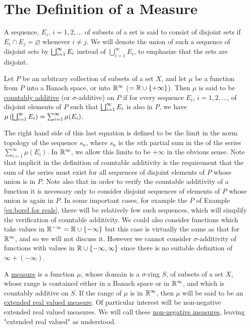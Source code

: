 \section{The Definition of a Measure}


A sequence, $E_i$, $i=1,2,\dots$ of subsets of a set is said to consist of disjoint sets if $E_i\cap E_j=\varnothing$ whenever $i\neq j$. We will denote the union of such a sequence of disjoint sets by $\bigsqcup_{i=1}^\infty E_i$ instead of $\bigcup_{i=1}^\infty E_i$, to emphasize that the sets are disjoint.

\begin{definition}
Let $P$ be an arbitrary collection of subsets of a set $X$, and let $\mu$ be a function from $P$ into a Banach space, or into $\mathbb{R}^\infty$ ($=\mathbb{R}\cup\left\{+\infty\right\}$). Then $\mu$ is said to be \underline{countably additive} (or $\sigma$-additive) on $P$ if for every sequence $E_i$, $i=1,2,\dots$, of disjoint elements of $P$ such that $\bigsqcup_{i=1}^\infty E_i$ is also in $P$, we have $\mu\left(\bigsqcup_{i=1}^\infty E_i\right)=\sum_{i=1}^\infty\mu(E_i)$. 
\end{definition}

The right hand side of this last equation is defined to be the limit in the norm topology of the sequence $s_n$, where $s_n$ is the $n$th partial sum in the of the series $\sum_{i=1}^\infty\mu(E_i)$. In $\mathbb{R}^\infty$, we allow this limits to be $+\infty$ in the obvious sense. Note that implicit in the definition of countable additivity is the requirement that the sum of the series must exist for all sequences of disjoint elements of $P$ whose union is in $P$. Note also that in order to verify the countable additivity of a function it is necessary only to consider disjoint sequences of elements of $P$ whose union is again in $P$. In some important cases, for example the $P$ of Example \ref{ex:borel for reals}, there will be relatively few such sequences, which will simplify the verification of countable additivity. We could also consider functions which take values in $\mathbb{R}^{-\infty}=\mathbb{R}\cup\left\{-\infty\right\}$ but this case is virtually the same as that for $\mathbb{R}^\infty$, and so we will not discuss it. However we cannot consider $\sigma$-additivity of functions with values in $\mathbb{R}\cup\left\{-\infty,\infty\right\}$ since there is no suitable definition of $\infty+(-\infty)$.

\begin{definition}
A \underline{measure} is a function $\mu$, whose domain is a $\sigma$-ring $S$, of subsets of a set $X$, whose range is contained either in a Banach space or in $\mathbb{R}^\infty$, and which is countably additive on $S$. If the range of $\mu$ is in $\mathbb{R}^\infty$, then $\mu$ will be said to be an \underline{extended real valued measure}. Of particular interest will be non-negative extended real valued measures. We will call these \underline{non-negative measures}, leaving "extended real valued" as understood.
\end{definition}

